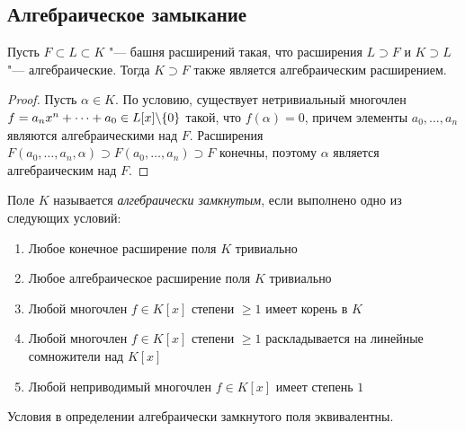 \subsection{Алгебраическое замыкание}

\begin{proposition}
	Пусть $F \subset L \subset K$ "--- башня расширений такая, что расширения $L \supset F$ и $K \supset L$ "--- алгебраические. Тогда $K \supset F$ также является алгебраическим расширением.
\end{proposition}

\begin{proof}
	Пусть $\alpha \in K$. По условию, существует нетривиальный многочлен $f \hm= a_nx^n + \dotsb + a_0 \in L[x] \backslash \{0\}$ такой, что $f(\alpha) = 0$, причем элементы $a_0, \dotsc, a_n$ являются алгебраическими над $F$. Расширения $F(a_0, \dotsc, a_n, \alpha) \supset F(a_0, \dotsc, a_n) \supset F$ конечны, поэтому $\alpha$ является алгебраическим над $F$.
\end{proof}

\begin{definition}
	Поле $K$ называется \textit{алгебраически замкнутым}, если выполнено одно из следующих условий:
	\begin{enumerate}
		\item Любое конечное расширение поля $K$ тривиально
		\item Любое алгебраическое расширение поля $K$ тривиально
		\item Любой многочлен $f \in K[x]$ степени $\ge 1$ имеет корень в $K$
		\item Любой многочлен $f \in K[x]$ степени $\ge 1$ раскладывается на линейные сомножители над $K[x]$
		\item Любой неприводимый многочлен $f \in K[x]$ имеет степень $1$
	\end{enumerate}
\end{definition}

\begin{proposition}
	Условия в определении алгебраически замкнутого поля эквивалентны.
\end{proposition}

